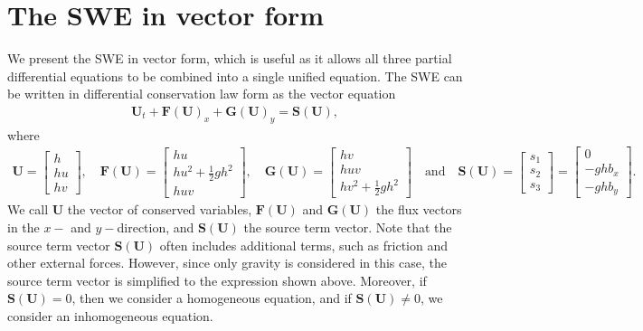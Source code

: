 \section{The SWE in vector form}
We present the SWE in vector form, which is useful as it allows all three partial differential equations to be combined into a single unified equation.
The SWE can be written in differential conservation law form as the vector equation
\begin{align}\label{eq:vector_form_2D}
    \mathbf{U}_t + \mathbf{F(U)}_x + \mathbf{G(U)}_y = \mathbf{S(U)},
\end{align}
where 
\begin{align*}
    \mathbf{U} = \begin{bmatrix}
        h \\
        hu \\
        hv
    \end{bmatrix},
    \quad 
    \mathbf{F(U)} = \begin{bmatrix}
        hu \\
        hu^2 + \frac{1}{2}gh^2 \\
        huv
    \end{bmatrix},
    \quad
    \mathbf{G(U)} = \begin{bmatrix}
        hv \\
        huv \\
        hv^2 + \frac{1}{2}gh^2
    \end{bmatrix}
    \quad \text{and} \quad
    \mathbf{S(U)} = \begin{bmatrix}
        s_1 \\
        s_2 \\
        s_3
    \end{bmatrix} = 
    \begin{bmatrix}
        0 \\
        -gh b_x \\
        -gh b_y
    \end{bmatrix}
    .
\end{align*}
We call $\mathbf{U}$ the vector of conserved variables, $\mathbf{F(U)}$ and $\mathbf{G(U)}$ the flux vectors in the $x-$ and $y-$direction, and $\mathbf{S(U)}$ the source term vector.
Note that the source term vector $\mathbf{S(U)}$ often includes additional terms, such as friction and other external forces.
However, since only gravity is considered in this case, the source term vector is simplified to the expression shown above.
Moreover, if $\mathbf{S(U)} = 0$, then we consider a homogeneous equation, and if $\mathbf{S(U)} \neq 0$, we consider an inhomogeneous equation.

